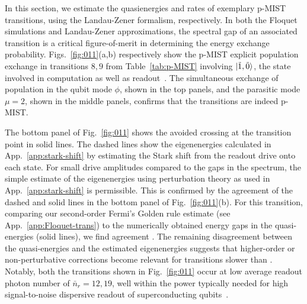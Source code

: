 \documentclass[%
reprint,
superscriptaddress,
 amsmath,amssymb,
 aps,
 prx,
longbibliography,
floatfix,
]{revtex4-2}
\newcommand{\singh}[1]{{\color{orange}{{}#1}}}%
\begin{document}
In this section, we estimate the quasienergies and rates of exemplary p-MIST transitions, using the Landau-Zener formalism, respectively. In both the Floquet simulations and Landau-Zener approximations, the spectral gap of an associated transition is a critical figure-of-merit in determining the \singh{adiabatic} energy exchange probability. Figs.~\ref{fig:011}(a,b) respectively show the p-MIST explicit population exchange in transitions $8,9$ from Table~\ref{tab:p-MIST} involving $\ket{\tilde{1},\tilde{0}}$, the state involved in computation as well as readout~\cite{zhang_universal_2021}. The simultaneous exchange of population in the qubit mode $\phi$, shown in the top panels, and the parasitic mode $\mu=2$, shown in the middle panels, confirms that the transitions are indeed p-MIST. 

The bottom panel of Fig.~\ref{fig:011} shows the avoided crossing at the transition point in solid lines. The dashed lines show the eigenenergies calculated in App.~\ref{app:stark-shift} by estimating the Stark shift from the readout drive onto each state. For small drive amplitudes compared to the gaps in the spectrum, the simple estimate of the eigenenergies using perturbation theory as used in App.~\ref{app:stark-shift} is permissible. This is confirmed by the agreement of the dashed and solid lines in the bottom panel of Fig.~\ref{fig:011}(b). For this transition, comparing our second-order Fermi's Golden rule estimate (see App.~\ref{app:Floquet-trans})  to the numerically obtained energy gaps in the quasi-energies (solid lines), we find agreement \singh{within $1$ MHz}. The remaining disagreement between the quasi-energies and the estimated eigenenergies suggests that higher-order or non-perturbative corrections become relevant for transitions slower than \singh{$\Delta_{ac}=1$ MHz}. Notably, both the transitions shown in Fig.~\ref{fig:011} occur at low average readout photon number of $\bar n_r=12,19$, well within the power typically needed for high signal-to-noise dispersive readout of superconducting qubits~\cite{gusenkova2021quantum}. 
\end{document}
